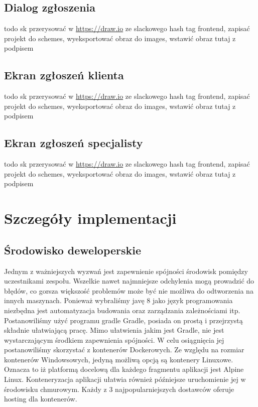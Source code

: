 \documentclass[10pt, titlepage, oneside, a4paper]{article}
\begin{document}
	\subsection{Dialog zgłoszenia}	
	todo sk przerysować w \url{https://draw.io} ze slackowego hash tag frontend, zapisać projekt do schemes, wyeksportować obraz do images, wstawić obraz tutaj z podpisem	
	
	\subsection{Ekran zgłoszeń klienta}
	todo sk przerysować w \url{https://draw.io} ze slackowego hash tag frontend, zapisać projekt do schemes, wyeksportować obraz do images, wstawić obraz tutaj z podpisem
	
	\subsection{Ekran zgłoszeń specjalisty}
	todo sk przerysować w \url{https://draw.io} ze slackowego hash tag frontend, zapisać projekt do schemes, wyeksportować obraz do images, wstawić obraz tutaj z podpisem  
  
	\section{Szczegóły implementacji}  
  
	\subsection{Środowisko deweloperskie}  
	Jednym z ważniejszych wyzwań jest zapewnienie spójności środowisk pomiędzy uczestnikami zespołu. Wszelkie
	nawet najmniejsze odchylenia mogą prowadzić do błędów, co gorsza większość problemów może być nie możliwa
	do odtworzenia na innych maszynach. Ponieważ wybraliśmy javę 8 jako język programowania niezbędna jest
	automatyzacja budowania oraz zarządzania zależnościami itp. Postanowiliśmy użyć programu gradle Gradle,
	posiada on prostą i przejrzystą składnie ułatwiającą pracę. Mimo ułatwienia jakim jest Gradle, nie jest
	wystarczającym środkiem zapewnienia spójności. W celu osiągnięcia jej postanowiliśmy skorzystać z
	kontenerów Dockerowych. Ze względu na rozmiar kontenerów Windowsowych, jedyną możliwą opcją są kontenery
	Linuxowe. Oznacza to iż platformą docelową dla każdego fragmentu aplikacji jest Alpine Linux. Konteneryzacja
	aplikacji ułatwia również późniejsze uruchomienie jej w środowisku chmurowym. Każdy z 3 najpopularniejszych
	dostawców oferuje hosting dla kontenerów.
  
\end{document}
